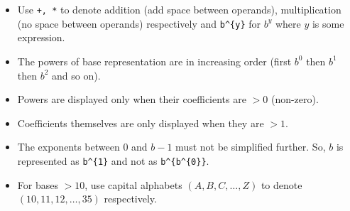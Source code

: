 \documentclass[../../Problems]{subfiles}
\begin{document}
\begin{itemize}
\item Use \verb!+, *! to denote addition (add space between operands), multiplication (no space between operands) respectively and \verb!b^{y}! for $b^y$ where $y$ is some expression.
\item The powers of base representation are in increasing order (first $b^0$ then $b^1$ then $b^2$ and so on).
\item Powers are displayed only when their coefficients are $>0$ (non-zero).
\item Coefficients themselves are only displayed when they are $>1$.
\item The exponents between 0 and $b-1$ must not be simplified further. So, $b$ is represented as \verb!b^{1}! and not as \verb!b^{b^{0}}!.
\item For bases $>10$, use capital alphabets $(A,B,C,\ldots,Z)$ to denote $(10,11,12,\ldots,35)$ respectively.
\end{itemize}
\end{document}
